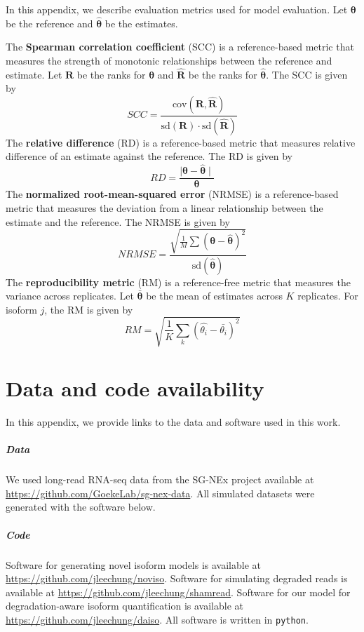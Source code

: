 In this appendix, we describe evaluation metrics used for model evaluation. Let $\bm\theta$ be the reference and $\hat{\bm\theta}$ be the estimates. 

The \textbf{Spearman correlation coefficient} (SCC) is a reference-based metric that measures the strength of monotonic relationships between the reference and estimate. Let $\bm R$ be the ranks for $\bm\theta$ and $\hat{\bm R}$ be the ranks for $\hat{\bm\theta}$. The SCC is given by
\begin{equation}
    SCC = \frac{\textrm{cov}(\bm{R},\hat{\bm{R}})}{\textrm{sd}(\bm{R})\cdot \textrm{sd}(\hat{\bm{R}})}
\end{equation}
The \textbf{relative difference} (RD) is a reference-based metric that measures relative difference of an estimate against the reference. The RD is given by
\begin{equation}
    RD = \frac{\mid\bm\theta-\hat{\bm\theta}\mid}{\bm\theta}
\end{equation}
The \textbf{normalized root-mean-squared error} (NRMSE) is a reference-based metric that measures the deviation from a linear relationship between the estimate and the reference. The NRMSE is given by
\begin{equation}
    NRMSE = \frac{\sqrt{\frac{1}{M}\sum\left(\bm\theta-\hat{\bm\theta}\right)^2}}{\textrm{sd}\left(\hat{\bm\theta}\right)}
\end{equation}
The \textbf{reproducibility metric} (RM) is a reference-free metric that measures the variance across replicates. Let $\bar{\bm\theta}$ be the mean of estimates across $K$ replicates. For isoform $j$, the RM is given by
\begin{equation}
    RM = \sqrt{\frac{1}{K}\sum_k \left(\hat{\theta_i} - \bar{\theta_i}\right)^2}
\end{equation}

\chapter{Data and code availability}

In this appendix, we provide links to the data and software used in this work. 

\paragraph{Data}
We used long-read RNA-seq data from the SG-NEx project available at \url{https://github.com/GoekeLab/sg-nex-data}. All simulated datasets were generated with the software below. 

\paragraph{Code}
Software for generating novel isoform models is available at \url{https://github.com/jleechung/noviso}. Software for simulating degraded reads is available at \url{https://github.com/jleechung/shamread}. Software for our model for degradation-aware isoform quantification is available at \url{https://github.com/jleechung/daiso}. All software is written in \texttt{python}. 
